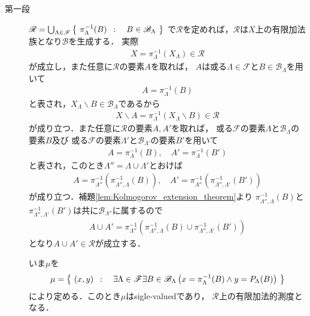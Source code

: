 	\begin{prf}\mbox{}
		\begin{description}
			\item[第一段]
				$\mathscr{R} = \bigcup_{\Lambda\in\mathscr{F}} \left\{\ \pi_\Lambda^{-1}(B)\ \, : \quad B \in \mathscr{B}_\Lambda\ \right\}$
				で$\mathscr{R}$を定めれば，$\mathscr{R}$は$X$上の有限加法族となり$\mathscr{B}$を生成する．
				実際
				\begin{align}
					X = \pi_\Lambda^{-1}(X_\Lambda) \in \mathscr{R}
				\end{align}
				が成立し，また任意に$\mathscr{R}$の要素$A$を取れば，
				$A$は或る$\Lambda \in \mathscr{F}$と$B \in \mathscr{B}_\Lambda$を用いて
				\begin{align}
					A = \pi_\Lambda^{-1}(B)
				\end{align}
				と表され，$X_\Lambda \backslash B \in \mathscr{B}_\Lambda$であるから
				\begin{align}
					X \backslash A = \pi_\Lambda^{-1}(X_\Lambda \backslash B) \in \mathscr{R}
				\end{align}
				が成り立つ．また任意に$\mathscr{R}$の要素$A,A'$を取れば，
				或る$\mathscr{F}$の要素$\Lambda$と$\mathscr{B}_\Lambda$の要素$B$及び
				或る$\mathscr{F}$の要素$\Lambda'$と$\mathscr{B}_{\Lambda'}$の要素$B'$を用いて
				\begin{align}
					A = \pi_\Lambda^{-1}(B),\quad A' = \pi_\Lambda^{-1}(B')
				\end{align}
				と表され，このとき$\Lambda'' = \Lambda \cup \Lambda'$とおけば
				\begin{align}
					A = \pi_{\Lambda''}^{-1}\left(\pi_{\Lambda'',\Lambda}^{-1}(B)\right),
					\quad A' = \pi_{\Lambda''}^{-1}\left(\pi_{\Lambda'',\Lambda'}^{-1}(B')\right)
				\end{align}
				が成り立つ．補題\ref{lem:Kolmogorov_extension_theorem}より
				$\pi_{\Lambda'',\Lambda}^{-1}(B)$と$\pi_{\Lambda'',\Lambda'}^{-1}(B')$は共に$\mathscr{B}_{\Lambda''}$に属するので
				\begin{align}
					A \cup A' =  \pi_{\Lambda''}^{-1}\left(\pi_{\Lambda'',\Lambda}^{-1}(B) \cup 
					\pi_{\Lambda'',\Lambda'}^{-1}(B')\right)
				\end{align}
				となり$A \cup A' \in \mathscr{R}$が成立する．
				
				いま$\mu$を
				\begin{align}
					\mu = \left\{\ (x,y)\ \, : \quad \exists \Lambda \in \mathscr{F}
					\exists B \in \mathscr{B}_\Lambda
					\left(x=\pi_\Lambda^{-1}(B) \wedge y = P_\Lambda(B)\right)\ \right\}
				\end{align}
				により定める．このとき$\mu$はsigle-valuedであり，
				$\mathscr{R}$上の有限加法的測度となる．
			

\end{description}
\end{prf}
